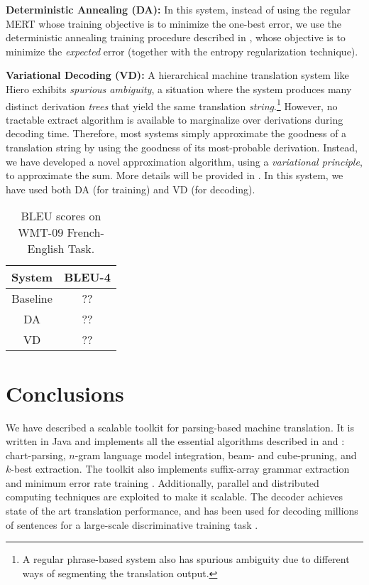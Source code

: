 \documentclass[11pt]{article}
\begin{document}
\textbf{Deterministic Annealing (DA): } In this system, instead of using the regular MERT \cite{discriminative-mert} whose training objective is to minimize the one-best error, we use the deterministic annealing training procedure described in , whose objective is to minimize the \emph{expected} error (together with the entropy regularization technique).

\textbf{Variational Decoding (VD): }  A hierarchical machine translation system like Hiero exhibits \emph{spurious ambiguity}, a situation where the system
produces many distinct derivation \emph{trees} that yield the same translation \emph{string}.\footnote{A regular phrase-based system also has spurious ambiguity due to different ways of segmenting the translation output.} However, no tractable extract algorithm is available to marginalize over derivations during decoding time. Therefore, most systems simply approximate the goodness of a translation string by using the goodness of its most-probable derivation. Instead, we have developed a novel approximation algorithm, using a \emph{variational principle}, to approximate the sum.
More details will be provided in . In this system, we have used both DA (for training) and VD (for decoding).



\begin{table}[t]
\begin{center}
\begin{tabular}{c c}\hline
System & BLEU-4 \\ \hline
Baseline & ?? \\
DA & ?? \\
VD & ?? \\ \hline
\end{tabular}
\end{center}
\caption{BLEU scores on WMT-09 French-English Task.}
\label{results-wmt09}
\end{table}

\section{Conclusions}
We have described a scalable toolkit for parsing-based machine translation. It is written in Java and implements all the essential algorithms described in  and : chart-parsing, $n$-gram language model integration, beam- and cube-pruning, and $k$-best extraction.
The toolkit also implements suffix-array grammar extraction \cite{adam-suffix} and minimum error rate training \cite{discriminative-mert}. Additionally, parallel and distributed computing techniques are exploited to make it scalable. The decoder achieves state of the art translation performance, and has been used for decoding millions of sentences for a large-scale discriminative training task \cite{zhifei-amta08}.
\end{document}
